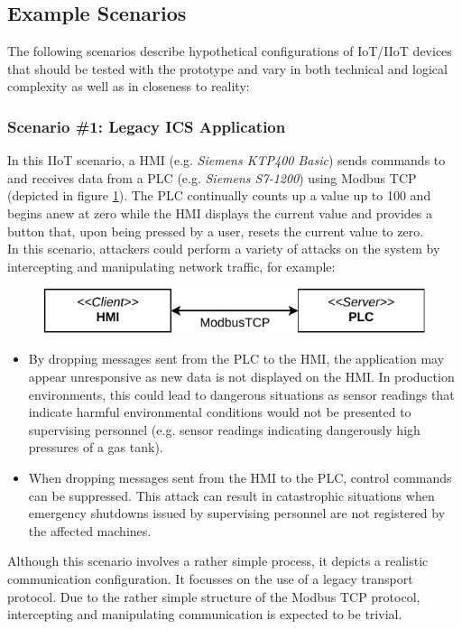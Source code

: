 \subsection{Example Scenarios}
\label{sec:example-scenarios}
The following scenarios describe hypothetical configurations of \ac{IoT}/\ac{IIoT} devices that should be tested with the prototype and vary in both technical and logical complexity as well as in closeness to reality:

\subsubsection{Scenario \#1: Legacy \ac{ICS} Application}
\label{par:scenario-1}
In this \ac{IIoT} scenario, a \ac{HMI} (e.g. \emph{Siemens KTP400 Basic}) sends commands to and receives data from a \ac{PLC} (e.g. \emph{Siemens S7-1200}) using Modbus \ac{TCP} (depicted in figure \ref{fig:arch-ics}). The \ac{PLC} continually counts up a value up to 100 and begins anew at zero while the \ac{HMI} displays the current value and provides a button that, upon being pressed by a user, resets the current value to zero. \\
In this scenario, attackers could perform a variety of attacks on the system by intercepting and manipulating network traffic, for example:
\begin{figure}[h]
    \centering
    \includegraphics{img/ch04/Scenario_ICS.pdf}
    \label{fig:arch-ics}
\end{figure}
\begin{itemize}
    \item By dropping messages sent from the \ac{PLC} to the \ac{HMI}, the application may appear unresponsive as new data is not displayed on the \ac{HMI}. In production environments, this could lead to dangerous situations as sensor readings that indicate harmful environmental conditions would not be presented to supervising personnel (e.g. sensor readings indicating dangerously high pressures of a gas tank).
    \item When dropping messages sent from the \ac{HMI} to the \ac{PLC}, control commands can be suppressed. This attack can result in catastrophic situations when emergency shutdowns issued by supervising personnel are not registered by the affected machines.
\end{itemize}
Although this scenario involves a rather simple process, it depicts a realistic communication configuration. It focusses on the use of a legacy transport protocol. Due to the rather simple structure of the Modbus \ac{TCP} protocol, intercepting and manipulating communication is expected to be trivial.

